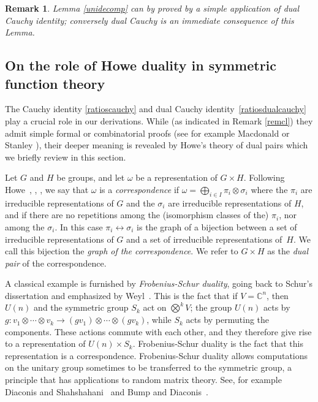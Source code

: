 \documentclass[11pt]{amsart}
\newcommand{\tmem}[1]{{\em #1\/}}
\newtheorem{varremark}{Remark}
\newenvironment{remark}{\begin{varremark}\em}{\em\end{varremark}}
\begin{document}
\begin{remark} \label{remcl} Lemma \ref{unidecomp} can by proved by a simple
application of dual Cauchy identity; conversely dual Cauchy is an
immediate consequence of this Lemma.
\end{remark}

\subsection{On the role of Howe duality in symmetric function
theory} \label{sec:hd}

The Cauchy identity \eqref{ratioscauchy} and dual Cauchy
identity~\eqref{ratiosdualcauchy} play a crucial role in our
derivations.  While (as indicated in Remark \ref{remcl}) they
admit simple formal or combinatorial proofs (see for example
Macdonald \cite{Mac} or Stanley \cite{stanleyv2}), their deeper
meaning is revealed by Howe's theory of dual pairs which we
briefly review in this section.

Let $G$ and $H$ be groups, and let $\omega$ be a representation of
$G \times H$. Following Howe~{\cite{howeclassical}},
{\cite{howetheta}}, {\cite{HowePerspectives}}, we say that
$\omega$ is a {\tmem{correspondence}} if $\omega = \bigoplus_{i
\in I} \pi_i \otimes \sigma_i$ where the $\pi_i$ are irreducible
representations of $G$ and the $\sigma_i$ are irreducible
representations of $H$, and if there are no repetitions among the
(isomorphism classes of the) $\pi_i$, nor among the $\sigma_i$. In
this case $\pi_i \longleftrightarrow \sigma_i$ is the graph of a
bijection between a set of irreducible representations of $G$ and
a set of irreducible representations of~$H$. We call this
bijection the {\tmem{graph of the correspondence}}. We refer to $G
\times H$ as the {\tmem{dual pair}} of the correspondence.

A classical example is furnished by  {\tmem{Frobenius-Schur
duality}}, going back to Schur's dissertation and emphasized by
Weyl~{\cite{weyl}}. This is the fact that if $V =\mathbb{C}^n$,
then $U ( n )$ and the symmetric group $S_k$ act on
${\bigotimes}^k V$; the group $U ( n )$ acts by $g : v_1 \otimes
\cdots \otimes v_k \longrightarrow ( g v_1 ) \otimes \cdots
\otimes ( g v_k )$, while $S_k$ acts by permuting the components.
These actions commute with each other, and they therefore give
rise to a representation of $U ( n ) \times S_k$. Frobenius-Schur
duality is the fact that this representation is a correspondence.
Frobenius-Schur duality allows computations on the unitary group
sometimes to be transferred to the symmetric group, a principle
that has applications to random matrix theory. See, for example
Diaconis and Shahshahani~{\cite{DS94}} and Bump and
Diaconis~{\cite{BD02}}.
\end{document}
